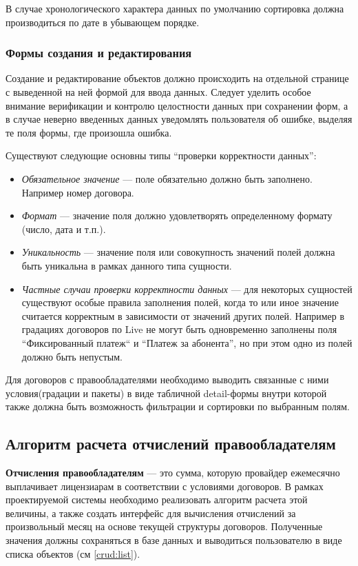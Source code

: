 В случае хронологического характера данных по умолчанию сортировка должна производиться по дате в убывающем порядке.

\subsubsection{Формы создания и редактирования}
\label{crud:forms}
Создание и редактирование объектов должно происходить на отдельной странице с выведенной на ней формой для ввода данных.
Следует уделить особое внимание верификации и контролю целостности данных при сохранении форм, а в случае неверно
введенных данных уведомлять пользователя об ошибке, выделяя те поля формы, где произошла ошибка.

Существуют следующие основны типы ``проверки корректности данных'':
\begin{itemize}
\item{
  \textit{Обязательное значение} --- поле обязательно должно быть заполнено. Например номер договора. 
}
\item{
  \textit{Формат} --- значение поля должно удовлетворять определенному формату (число, дата и т.п.).
}
\item{
  \textit{Уникальность} --- значение поля или совокупность значений полей должна быть уникальна в рамках
данного типа сущности.
}
\item{
  \textit{Частные случаи проверки корректности данных} --- для некоторых сущностей существуют особые правила заполнения полей,
  когда то или иное значение считается корректным в зависимости от значений других полей. 
  Например в градациях договоров по Live не могут быть одновременно заполнены поля ``Фиксированный платеж`` 
  и ``Платеж за абонента'', но при этом одно из полей должно быть непустым.
}
\end{itemize}

Для договоров с правообладателями необходимо выводить связанные с ними условия(градации и пакеты)
в виде табличной detail-формы внутри которой также должна быть возможность фильтрации и сортировки по выбранным полям.

\subsection{Алгоритм расчета отчислений правообладателям}
\label{live:deducts}
\textbf{Отчисления правообладателям} --- это сумма, которую провайдер ежемесячно выплачивает лицензиарам
в соответствии с условиями договоров. В рамках проектируемой системы необходимо реализовать алгоритм расчета
этой величины, а также создать интерфейс для вычисления отчислений за произвольный месяц на основе текущей 
структуры договоров. Полученные значения должны сохраняться в базе данных и выводиться пользователю 
в виде списка объектов (см \ref{crud:list}).

